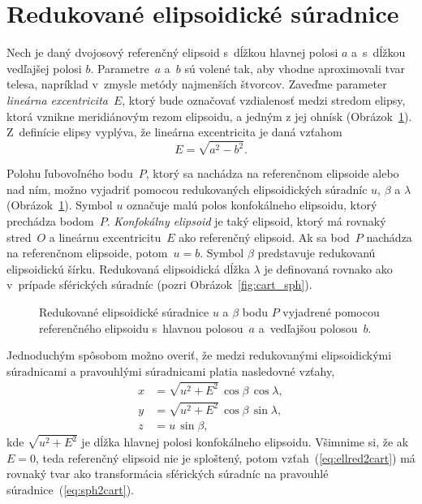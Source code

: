 \documentclass[a4paper,12pt]{book}
\begin{document}
\section{Redukované elipsoidické súradnice}
\label{sec:reduced_ell_coords}

Nech je daný dvojosový referenčný elipsoid s~dĺžkou hlavnej polosi $a$ 
a~s~dĺžkou vedľajšej polosi $b$.  Parametre~$a$ a~$b$ sú volené tak, aby vhodne 
aproximovali tvar telesa, napríklad v~zmysle metódy najmenších štvorcov.  
Zaveďme parameter \emph{lineárna excentricita}~$E$, ktorý bude označovať 
vzdialenosť medzi stredom elipsy, ktorá vznikne meridiánovým rezom elipsoidu, 
a jedným z jej ohnísk (Obrázok~\ref{fig:reduced_ell_coords}).  Z~definície 
elipsy vyplýva, že lineárna excentricita je daná vzťahom
%
\begin{equation}
\label{eq:linear_eccentricity}
E = \sqrt{a^2 - b^2}{.}
\end{equation}

Polohu ľubovoľného bodu~$P$, ktorý sa nachádza na referenčnom elipsoide alebo 
nad ním, možno vyjadriť pomocou redukovaných elipsoidických súradníc $u$, 
$\beta$ a $\lambda$ (Obrázok~\ref{fig:reduced_ell_coords}).  Symbol $u$ 
označuje malú polos konfokálneho elipsoidu, ktorý prechádza bodom~$P$.  
\emph{Konfokálny elipsoid} je taký elipsoid, ktorý má rovnaký stred~$O$ 
a lineárnu excentricitu~$E$ ako referenčný elipsoid.  Ak sa bod~$P$ nachádza na 
referenčnom elipsoide, potom~$u = b$.  Symbol $\beta$ predstavuje redukovanú 
elipsoidickú šírku.  Redukovaná elipsoidická dĺžka $\lambda$ je definovaná 
rovnako ako v~prípade sférických súradníc (pozri Obrázok~\ref{fig:cart_sph}).

\begin{figure}
\centering

\caption{Redukované elipsoidické súradnice $u$ a $\beta$ bodu $P$ vyjadrené 
pomocou referenčného elipsoidu s~hlavnou polosou~$a$ a~vedľajšou polosou~$b$.}
\label{fig:reduced_ell_coords}
\end{figure}

Jednoduchým spôsobom možno overiť, že medzi redukovanými elipsoidickými 
súradnicami a pravouhlými súradnicami platia nasledovné vzťahy,
%
\begin{equation}
\label{eq:ellred2cart}
\begin{split}
x &= \sqrt{u^2 + E^2} \, \cos\beta \, \cos\lambda{,}\\
y &= \sqrt{u^2 + E^2} \, \cos\beta \, \sin\lambda{,}\\
z &= u \, \sin\beta{,}
\end{split}
\end{equation}
%
kde $\sqrt{u^2 + E^2}$ je dĺžka hlavnej polosi konfokálneho elipsoidu.  
Všimnime si, že ak $E = 0$, teda referenčný elipsoid nie je sploštený, potom 
vzťah~(\ref{eq:ellred2cart}) má rovnaký tvar ako transformácia sférických 
súradníc na pravouhlé súradnice~(\ref{eq:sph2cart}).
\end{document}
